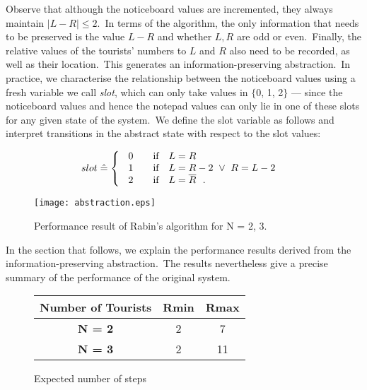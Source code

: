 \documentclass[numbers,copyright,creativecommons]{eptcs}
\newcommand{\Defs}{\mathrel{\hat{=}}}
\begin{document}
Observe that although the noticeboard values are incremented, they always maintain $|L-R| \leq 2$.\ In terms of the algorithm, the only information that needs to be preserved is the value $L-R$ and whether $L,R$ are odd or even.\ Finally, the relative values of the tourists' numbers to $L$ and $R$ also need to be recorded, as well as their location.\ This generates an information-preserving abstraction.\ In practice, we characterise the relationship between the noticeboard values using a fresh variable we call {\it slot}, which can only take values in $\{$0, 1, 2$\}$ --- since the noticeboard values and hence the notepad values can only lie in one of these slots for any given state of the system.\ We define the slot variable as follows and interpret transitions in the abstract state with respect to the slot values:

\[ slot \Defs \left\{ \begin{array}{l}
 \hspace*{-1ex}\begin{array}[t]{l}
\ 0 \quad \quad $if$ \quad L = R \\
\ 1 \quad \quad $if$ \quad  L = R - 2\  \vee \ R = L - 2\\
\ 2 \quad \quad $if$ \quad  L = \overline{R}\ \ .
\
\end{array}
\end{array}\right.\]

\begin{figure}
\begin{center}
\texttt{[image: abstraction.eps]}
\end{center}\vspace{-0.5cm}

\caption{Performance result of Rabin's algorithm for N = 2, 3.}\label{fig:abstraction}
\end{figure}
In the section that follows, we explain the performance results derived from the information-preserving abstraction.\ The results nevertheless give a precise summary of the performance of the original system.

\begin{figure}
\begin{center}
\noindent\begin{tabular}{|c|c|c|}
\hline
{\quad \bf Number of Tourists\quad } & {\quad \bf Rmin \quad } & {\quad \bf Rmax \quad}\\ \hline
{\bf N = 2} &  2 & 7 \\
\hline
{\bf N = 3} &  2 & 11 \\
\hline
\end{tabular}
\caption{\rm Expected number of steps} \label{fig:analysis}\vspace{-.5cm}
\end{center}
\end{figure}
\end{document}
